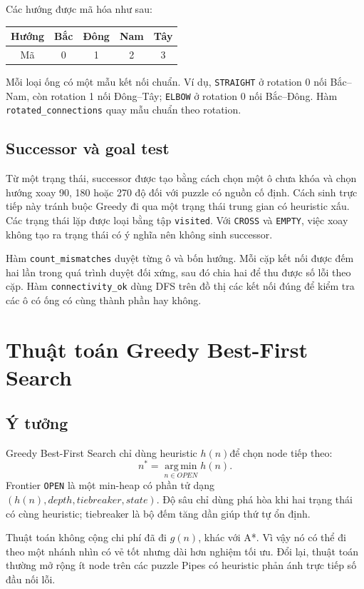 \documentclass[12pt,a4paper]{article}
\newcommand{\code}[1]{\texttt{#1}}
\newcommand{\Hn}{\ensuremath{h(n)}}
\newcommand{\argmin}{\operatorname*{arg\,min}}
\begin{document}
Các hướng được mã hóa như sau:
\begin{center}
\begin{tabular}{c|cccc}
\toprule
Hướng & Bắc & Đông & Nam & Tây\\
\midrule
Mã & 0 & 1 & 2 & 3\\
\bottomrule
\end{tabular}
\end{center}

Mỗi loại ống có một mẫu kết nối chuẩn. Ví dụ, \code{STRAIGHT} ở rotation 0 nối Bắc--Nam, còn rotation 1 nối Đông--Tây; \code{ELBOW} ở rotation 0 nối Bắc--Đông. Hàm \code{rotated\_connections} quay mẫu chuẩn theo rotation.

\subsection{Successor và goal test}
Từ một trạng thái, successor được tạo bằng cách chọn một ô chưa khóa và chọn hướng xoay 90, 180 hoặc 270 độ đối với puzzle có nguồn cố định. Cách sinh trực tiếp này tránh buộc Greedy đi qua một trạng thái trung gian có heuristic xấu. Các trạng thái lặp được loại bằng tập \code{visited}. Với \code{CROSS} và \code{EMPTY}, việc xoay không tạo ra trạng thái có ý nghĩa nên không sinh successor.

Hàm \code{count\_mismatches} duyệt từng ô và bốn hướng. Mỗi cặp kết nối được đếm hai lần trong quá trình duyệt đối xứng, sau đó chia hai để thu được số lỗi theo cặp. Hàm \code{connectivity\_ok} dùng DFS trên đồ thị các kết nối đúng để kiểm tra các ô có ống có cùng thành phần hay không.

\section{Thuật toán Greedy Best-First Search}
\subsection{Ý tưởng}
Greedy Best-First Search chỉ dùng heuristic \Hn để chọn node tiếp theo:
\begin{equation}
  n^*=\argmin_{n\in OPEN} h(n).
\end{equation}
Frontier \code{OPEN} là một min-heap có phần tử dạng \((h(n),depth,tiebreaker,state)\). Độ sâu chỉ dùng phá hòa khi hai trạng thái có cùng heuristic; tiebreaker là bộ đếm tăng dần giúp thứ tự ổn định.

Thuật toán không cộng chi phí đã đi \(g(n)\), khác với A*. Vì vậy nó có thể đi theo một nhánh nhìn có vẻ tốt nhưng dài hơn nghiệm tối ưu. Đổi lại, thuật toán thường mở rộng ít node trên các puzzle Pipes có heuristic phản ánh trực tiếp số đầu nối lỗi.
\end{document}
